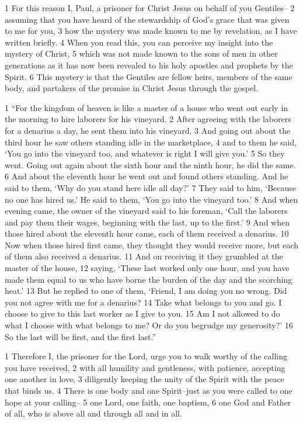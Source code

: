 \begin{bible}
1 For this reason I, Paul, a prisoner for Christ Jesus on behalf of you Gentiles-- 2 assuming that you have heard of the stewardship of God's grace that was given to me for you, 3 how the mystery was made known to me by revelation, as I have written briefly. 4 When you read this, you can perceive my insight into the mystery of Christ, 5 which was not made known to the sons of men in other generations as it has now been revealed to his holy apostles and prophets by the Spirit. 6 This mystery is that the Gentiles are fellow heirs, members of the same body, and partakers of the promise in Christ Jesus through the gospel.


1 ``For the kingdom of heaven is like a master of a house who went out early in the morning to hire laborers for his vineyard. 2 After agreeing with the laborers for a denarius a day, he sent them into his vineyard. 3 And going out about the third hour he saw others standing idle in the marketplace, 4 and to them he said, `You go into the vineyard too, and whatever is right I will give you.' 5 So they went. Going out again about the sixth hour and the ninth hour, he did the same. 6 And about the eleventh hour he went out and found others standing. And he said to them, `Why do you stand here idle all day?' 7 They said to him, `Because no one has hired us.' He said to them, `You go into the vineyard too.' 8 And when evening came, the owner of the vineyard said to his foreman, `Call the laborers and pay them their wages, beginning with the last, up to the first.' 9 And when those hired about the eleventh hour came, each of them received a denarius. 10 Now when those hired first came, they thought they would receive more, but each of them also received a denarius. 11 And on receiving it they grumbled at the master of the house, 12 saying, `These last worked only one hour, and you have made them equal to us who have borne the burden of the day and the scorching heat.' 13 But he replied to one of them, `Friend, I am doing you no wrong. Did you not agree with me for a denarius? 14 Take what belongs to you and go. I choose to give to this last worker as I give to you. 15 Am I not allowed to do what I choose with what belongs to me? Or do you begrudge my generosity?' 16 So the last will be first, and the first last.''

1 Therefore I, the prisoner for the Lord, urge you to walk worthy of the calling you have received, 2 with all humility and gentleness, with patience, accepting one another in love, 3 diligently keeping the unity of the Spirit with the peace that binds us. 4 There is one body and one Spirit--just as you were called to one hope at your calling-- 5 one Lord, one faith, one baptism, 6 one God and Father of all, who is above all and through all and in all.


\end{bible}
